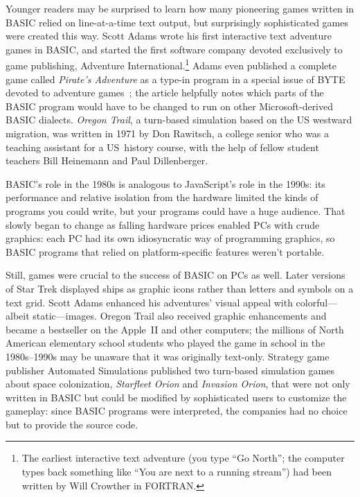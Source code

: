 Younger readers may be surprised to learn how many pioneering games
written in BASIC relied on line-at-a-time text output, but
surprisingly sophisticated games were created this way.
Scott Adams wrote his first interactive text adventure games in BASIC, and started
the first software company devoted exclusively to game publishing,
Adventure International.\footnote{The earliest interactive text adventure (you type
``Go North''; the computer types back something like ``You are next to a
running stream'') had been written by Will Crowther in FORTRAN.}
Adams even published a complete game called \emph{Pirate's Adventure} as
a type-in program in a special issue of BYTE devoted to adventure
games~\cite{byte80:adventure}; the article helpfully notes which parts
of the BASIC program would have to be changed to run on other
Microsoft-derived BASIC dialects.
\emph{Oregon Trail}, a turn-based simulation based on the US westward
migration, was written in 1971 by Don Rawitsch, a college senior who was
a teaching assistant for a US~history course, with the help of
fellow student teachers Bill Heinemann and Paul Dillenberger.


BASIC's role in the 1980s is analogous to JavaScript's role in the
1990s: its performance and relative isolation from the hardware limited
the kinds of programs you could write, but your programs could have a
huge audience.
That slowly began to change 
as falling hardware prices enabled PCs with crude graphics:
each PC had its own idiosyncratic way of programming graphics, so BASIC
programs that relied on
platform-specific features weren't portable.

Still, games were crucial to the success of BASIC on PCs as well.
Later versions of Star Trek displayed ships as graphic icons rather than
letters and symbols on a text grid.
Scott Adams enhanced his adventures' visual appeal with colorful---albeit
static---images.
Oregon Trail also received graphic enhancements and became
a bestseller on the Apple~II and other computers;
the millions of
North American elementary school students who played the game in school
in the 1980s--1990s
may be unaware that it was originally text-only.
Strategy game publisher
Automated Simulations published two turn-based simulation games about
space colonization,
\emph{Starfleet Orion} and \emph{Invasion Orion}, that were not only
written in BASIC but could be modified by sophisticated users to
customize the gameplay: since BASIC programs were interpreted, the
companies had no choice but to provide the source code.

